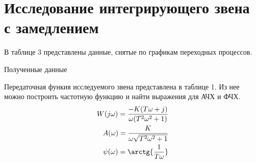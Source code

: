 \documentclass[a4paper, 12pt]{article}
\begin{document}
\newpage
\section{Исследование интегрирующего звена с замедлением}

В таблице 3 представлены данные, снятые по графикам переходных процессов. \par
\begin{table}[h!]
    \centering
    \begin{threeparttable}
        \caption{Полученные данные} \label{tab:perflogcross}
    \end{threeparttable}
\end{table}
Передаточная функия исследуемого звена представлена в таблице 1. Из нее можно построить частотную функцию и найти выражения для АЧХ и ФЧХ.
\begin{align}
    W(j\omega) = \frac{-K(T\omega + j)}{\omega(T^2\omega^2 + 1)} \\
    A(\omega) = \frac{K}{\omega\sqrt{T^2\omega^2 + 1}} \\
    \psi(\omega) = \arctg{\frac{1}{T\omega}}
\end{align}
\end{document}
